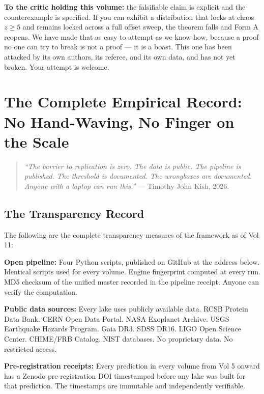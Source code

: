 \documentclass[11pt, letterpaper, openany]{book}
\begin{document}
\begin{newworld}
\begin{objectionbox}
\textbf{To the critic holding this volume:} the falsifiable claim is explicit and the
counterexample is specified. If you can exhibit a distribution that locks at chaos $z \geq 5$
and remains locked across a full offset sweep, the theorem falls and Form A reopens. We have
made that as easy to attempt as we know how, because a proof no one can try to break is not a
proof --- it is a boast. This one has been attacked by its own authors, its referee, and its
own data, and has not yet broken. Your attempt is welcome.
\end{objectionbox}
 
 \clearpage
\chapter{The Complete Empirical Record: No Hand-Waving, No Finger on the Scale}

\begin{quote}
\textit{``The barrier to replication is zero. The data is public.
The pipeline is published. The threshold is documented. The wrongboxes
are documented. Anyone with a laptop can run this.''} ---
Timothy John Kish, 2026.
\end{quote}

\section{The Transparency Record}

The following are the complete transparency measures of the framework
as of Vol 11:

\textbf{Open pipeline:} Four Python scripts, published on GitHub
at the address below. Identical scripts used for every volume.
Engine fingerprint computed at every run. MD5 checksum of the
unified master recorded in the pipeline receipt. Anyone can verify
the computation.

\textbf{Public data sources:} Every lake uses publicly available
data. RCSB Protein Data Bank. CERN Open Data Portal. NASA Exoplanet
Archive. USGS Earthquake Hazards Program. Gaia DR3. SDSS DR16.
LIGO Open Science Center. CHIME/FRB Catalog. NIST databases.
No proprietary data. No restricted access.

\textbf{Pre-registration receipts:} Every prediction in every volume
from Vol 5 onward has a Zenodo pre-registration DOI timestamped before
any lake was built for that prediction. The timestamps are immutable
and independently verifiable.


\end{newworld}
\end{document}
